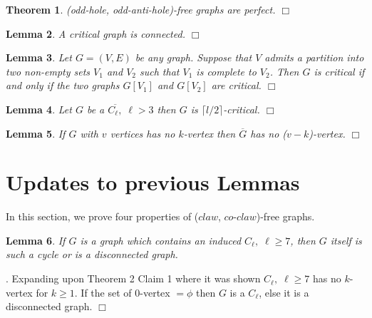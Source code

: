 \documentclass[12pt]{article}
\newtheorem{Theorem}{Theorem}[section]
\newtheorem{Lemma}[Theorem]{Lemma}
\def\CCO{($claw$, $co$-$claw$)}
\begin{document}
\begin{Theorem}\label{thm:StrongPerfect}
(odd-hole, odd-anti-hole)-free graphs are perfect. $\Box$
\end{Theorem}

\begin{Lemma}\label{lem:connected}
A critical graph is connected. $\Box$
\end{Lemma}

\begin{Lemma}\label{lem:join-critical}{\rm \cite{DhaHam2014}}
Let $G=(V,E)$ be any graph.  Suppose that $V$ admits a partition into
two non-empty sets $V_1$ and $V_2$ such that $V_1$ is complete to
$V_2$.  Then $G$ is critical if and only if the two graphs $G[V_1]$
and $G[V_2]$ are critical. $\Box$
\end{Lemma}

\begin{Lemma}\label{lem:anti-hole-critical}
Let $G$ be a $\overline{C_\ell,}\; \ell >3$ then $G$ is $\lceil l/2 \rceil$-critical. $\Box$
\end{Lemma}

\begin{Lemma}\label{lem:complement-k-vertex}
If $G$ with $v$ vertices has no $k$-vertex then $\overline{G}$ has no ($v-k$)-vertex. $\Box$
\end{Lemma}

\section{Updates to previous Lemmas}\label{sec:updates}
In this section, we prove four properties of {\CCO}-free graphs.

\begin{Lemma}\label{lem:C7Cycle}
If $G$ is a graph which contains an induced $C_\ell,\; \ell \geq 7$, then $G$ itself is such a cycle or is a disconnected graph.
\end{Lemma}
.  Expanding \cite{BraFud2002} upon Theorem 2 Claim 1 where it was shown $C_\ell,\; \ell \geq 7$ has no $k$-vertex for $k \geq 1$. If the set of $0$-vertex $= \phi$ then $G$ is a $C_\ell$, else it is a disconnected graph.  $\Box$

\medskip
\end{document}
